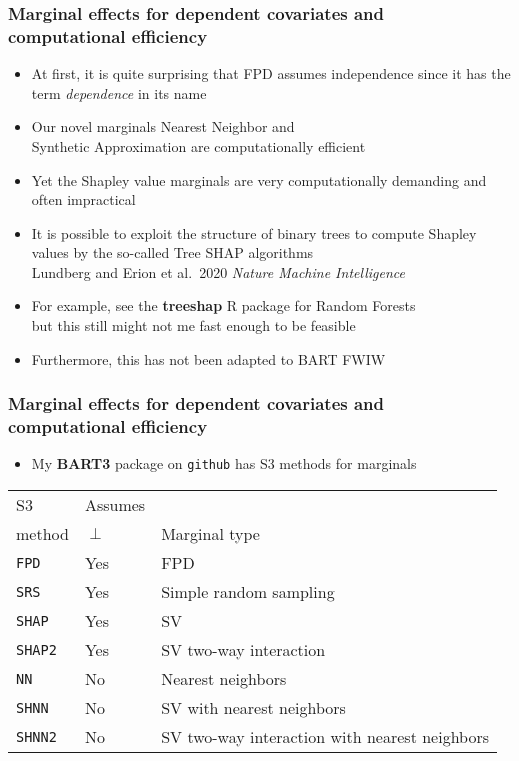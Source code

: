 \documentclass[11pt,dvipsnames,usenames,times]{beamer}
\begin{document}
\begin{frame}\frametitle{Marginal effects for dependent covariates and\\ 
computational efficiency }
\begin{itemize}
\item At first, it is quite surprising that FPD assumes independence since it has 
the term {\it dependence} in its name
\item Our novel marginals Nearest Neighbor and\\ 
Synthetic Approximation are computationally efficient
\item Yet the Shapley value marginals are very computationally demanding 
and often impractical
\item It is possible to exploit the structure of binary trees to 
  compute Shapley values by the so-called Tree SHAP algorithms\\
 Lundberg and Erion et al.\ 2020 {\it Nature Machine Intelligence}\\ 
\item For example, see the {\bf treeshap} R package for Random Forests\\
but this still might not me fast enough to be feasible
\item Furthermore, this has not been adapted to BART FWIW
\end{itemize}
\end{frame}


\begin{frame}\frametitle{Marginal effects for dependent covariates and\\ 
computational efficiency }
\begin{itemize}
\item My {\bf BART3} package on {\tt github} has S3 methods for marginals
\end{itemize}
\begin{tabular}{lll} \hline
S3 & Assumes &  \\ 
method & $\perp$ & Marginal type \\ \hline
{\tt FPD} & Yes       & FPD \\
{\tt SRS} & Yes       & Simple random sampling \\
{\tt SHAP} & Yes      & SV \\
{\tt SHAP2} & Yes     & SV two-way interaction \\
{\tt NN}  & No        & Nearest neighbors \\
{\tt SHNN}& No        & SV with nearest neighbors \\
{\tt SHNN2}& No        & SV two-way interaction with nearest neighbors \\
\end{tabular}
\end{frame}
\end{document}

